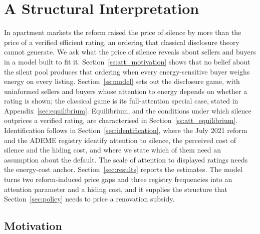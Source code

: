 
\section{A Structural Interpretation}
\label{sec:model}

In apartment markets the reform raised the price of silence by more than the price of a verified efficient rating, an ordering that classical disclosure theory cannot generate. We ask what the price of silence reveals about sellers and buyers in a model built to fit it. Section~\ref{ss:att_motivation} shows that no belief about the silent pool produces that ordering when every energy-sensitive buyer weighs energy on every listing. Section~\ref{ss:model} sets out the disclosure game, with uninformed sellers and buyers whose attention to energy depends on whether a rating is shown; the classical game is its full-attention special case, stated in Appendix~\ref{sec:equilibrium}. Equilibrium, and the conditions under which silence outprices a verified rating, are characterised in Section~\ref{ss:att_equilibrium}. Identification follows in Section~\ref{sec:identification}, where the July 2021 reform and the ADEME registry identify attention to silence, the perceived cost of silence and the hiding cost, and where we state which of them need an assumption about the default. The scale of attention to displayed ratings needs the energy-cost anchor. Section~\ref{sec:results} reports the estimates. The model turns two reform-induced price gaps and three registry frequencies into an attention parameter and a hiding cost, and it supplies the structure that Section~\ref{sec:policy} needs to price a renovation subsidy.

\subsection{Motivation}
\label{ss:model_motivation}
\label{ss:att_motivation}

